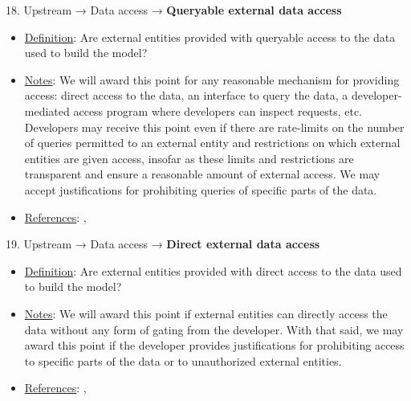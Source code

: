 18. Upstream → Data access → \textbf{Queryable external data access}
\vspace{-\parskip}
\begin{itemize}
	\item
	\underline{Definition}: Are external entities provided with queryable access to the data used to build the model?
	\item
	\underline{Notes}: We will award this point for any reasonable mechanism for providing access: direct access to the data, an interface to query the data, a developer-mediated access program where developers can inspect requests, etc. Developers may receive this point even if there are rate-limits on the number of queries permitted to an external entity and restrictions on which external entities are given access, insofar as these limits and restrictions are transparent and ensure a reasonable amount of external access. We may accept justifications for prohibiting queries of specific parts of the data.
	\item
	\underline{References}: \citet{gebru2021datasheets}, \citet{piktus2023roots}
\end{itemize} \vspace{\baselineskip}


19. Upstream → Data access → \textbf{Direct external data access}
\vspace{-\parskip}
\begin{itemize}
	\item
	\underline{Definition}: Are external entities provided with direct access to the data used to build the model?
	\item
	\underline{Notes}: We will award this point if external entities can directly access the data without any form of gating from the developer. With that said, we may award this point if the developer provides justifications for prohibiting access to specific parts of the data or to unauthorized external entities.
	\item
	\underline{References}: \citet{gebru2021datasheets}, \citet{piktus2023roots}
\end{itemize} \vspace{\baselineskip}


